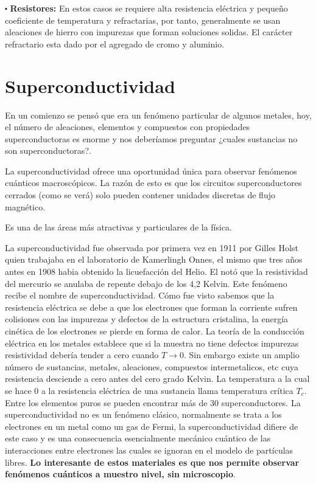 $\centerdot$ \textbf{Resistores:}
En estos casos se requiere alta resistencia eléctrica y pequeño coeficiente de temperatura y refractarias, por tanto, generalmente se usan aleaciones de hierro con impurezas que forman soluciones solidas. El carácter refractario esta dado por el agregado de cromo y aluminio.


\section{Superconductividad}

En un comienzo se pensó que era un fenómeno particular de algunos metales, hoy, el número de aleaciones, elementos y compuestos con propiedades superconductoras es enorme y nos deberíamos preguntar ¿cuales sustancias no son superconductoras?.

La superconductividad ofrece una oportunidad única para observar fenómenos cuánticos macroscópicos. La razón de esto es que los circuitos superconductores cerrados (como se verá) solo pueden contener unidades discretas de flujo magnético.

Es una de las áreas más atractivas y particulares de la física.

La superconductividad fue observada por primera vez en 1911 por Gilles Holst quien trabajaba en el laboratorio de Kamerlingh Onnes, el mismo que tres años antes en 1908 habia obtenido la licuefacción del Helio. El notó que la resistividad del mercurio se anulaba de repente debajo de los 4,2 Kelvin. Este fenómeno recibe el nombre de superconductividad. Cómo fue visto sabemos que la resistencia eléctrica se debe a que los electrones que forman la corriente sufren colisiones con las impurezas y defectos de la estructura cristalina, la energía cinética de los electrones se pierde en forma de calor. La teoría de la conducción eléctrica en los metales establece que si la muestra no tiene defectos impurezas resistividad debería tender a cero cuando $T\rightarrow 0$. Sin embargo existe un amplio número de sustancias, metales, aleaciones, compuestos intermetalicos, etc cuya resistencia desciende a cero antes del cero grado Kelvin. La temperatura a la cual se hace 0 a la resistencia eléctrica de una sustancia llama temperatura crítica $T_{c}$. Entre los elementos puros se pueden encontrar más de 30 superconductores. La superconductividad no es un fenómeno clásico, normalmente se trata a los electrones en un metal como un gas de Fermi, la superconductividad difiere de este caso y es una consecuencia esencialmente mecánico cuántico de las interacciones entre electrones las cuales se ignoran en el modelo de partículas libres. \textbf{Lo interesante de estos materiales es que nos permite observar fenómenos cuánticos a muestro nivel, sin microscopio}.

